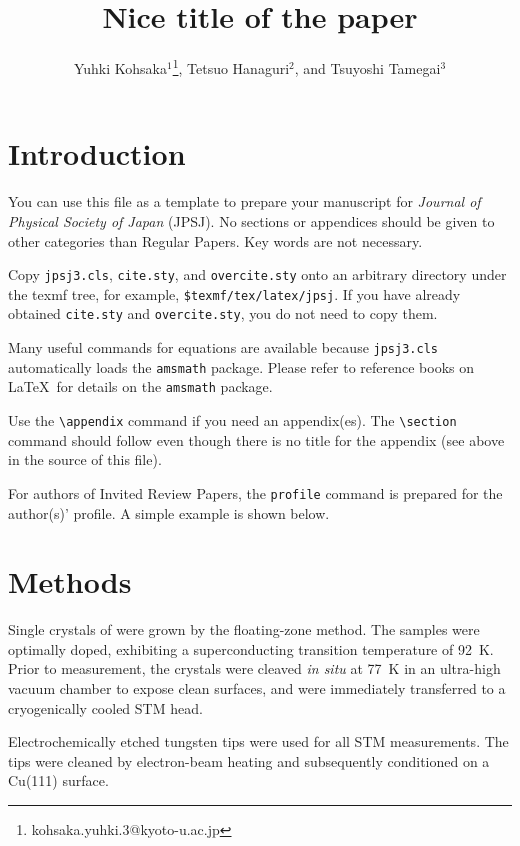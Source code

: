 \documentclass[shortnote,twocolumn]{jpsj3}
\title{Nice title of the paper}
\author{Yuhki Kohsaka$^1$\thanks{kohsaka.yuhki.3@kyoto-u.ac.jp}, Tetsuo Hanaguri$^2$, and Tsuyoshi Tamegai$^3$}
\begin{document}
\maketitle

\section{Introduction}

You can use this file as a template to prepare your manuscript for \textit{Journal of Physical Society of Japan} (JPSJ)\cite{jpsj,instructions}. No sections or appendices should be given to other categories than Regular Papers. Key words are not necessary.

Copy \verb|jpsj3.cls|, \verb|cite.sty|, and \verb|overcite.sty| onto an arbitrary directory under the texmf tree, for example, \verb|$texmf/tex/latex/jpsj|. If you have already obtained \verb|cite.sty| and \verb|overcite.sty|, you do not need to copy them.

Many useful commands for equations are available because \verb|jpsj3.cls| automatically loads the \verb|amsmath| package. Please refer to reference books on \LaTeX\ for details on the \verb|amsmath| package.

Use the \verb|\appendix| command if you need an appendix(es). The \verb|\section| command should follow even though there is no title for the appendix (see above in the source of this file).

For authors of Invited Review Papers, the \verb|profile| command is prepared for the author(s)' profile.  A simple example is shown below.

\section{Methods}

Single crystals of  were grown by the floating-zone method.
The samples were optimally doped, exhibiting a superconducting transition temperature of \qty{92}{\kelvin}.
Prior to measurement, the crystals were cleaved \textit{in situ} at \qty{77}{\kelvin} in an ultra-high vacuum chamber to expose clean surfaces, and were immediately transferred to a cryogenically cooled STM head.

Electrochemically etched tungsten tips were used for all STM measurements.
The tips were cleaned by electron-beam heating and subsequently conditioned on a Cu(111) surface.
\end{document}

